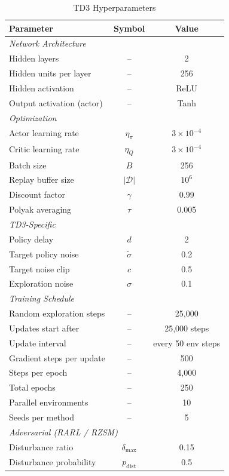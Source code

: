 \documentclass[conference]{IEEEtran}
\begin{document}
\begin{table}[h]
\centering
\caption{TD3 Hyperparameters}
\label{tab:hyperparams}
\begin{tabular}{lcc}
\hline
\textbf{Parameter} & \textbf{Symbol} & \textbf{Value} \\
\hline
\multicolumn{3}{l}{\textit{Network Architecture}} \\
Hidden layers & -- & 2 \\
Hidden units per layer & -- & 256 \\
Hidden activation & -- & ReLU \\
Output activation (actor) & -- & Tanh \\
\hline
\multicolumn{3}{l}{\textit{Optimization}} \\
Actor learning rate & $\eta_\pi$ & $3 \times 10^{-4}$ \\
Critic learning rate & $\eta_Q$ & $3 \times 10^{-4}$ \\
Batch size & $B$ & 256 \\
Replay buffer size & $|\mathcal{D}|$ & $10^6$ \\
Discount factor & $\gamma$ & 0.99 \\
Polyak averaging & $\tau$ & 0.005 \\
\hline
\multicolumn{3}{l}{\textit{TD3-Specific}} \\
Policy delay & $d$ & 2 \\
Target policy noise & $\tilde{\sigma}$ & 0.2 \\
Target noise clip & $c$ & 0.5 \\
Exploration noise & $\sigma$ & 0.1 \\
\hline
\multicolumn{3}{l}{\textit{Training Schedule}} \\
Random exploration steps & -- & 25{,}000 \\
Updates start after & -- & 25{,}000 steps \\
Update interval & -- & every 50 env steps \\
Gradient steps per update & -- & 500 \\
Steps per epoch & -- & 4{,}000 \\
Total epochs & -- & 250 \\
Parallel environments & -- & 10 \\
Seeds per method & -- & 5 \\
\hline
\multicolumn{3}{l}{\textit{Adversarial (RARL / RZSM)}} \\
Disturbance ratio & $\delta_{\max}$ & 0.15 \\
Disturbance probability & $p_{\mathrm{dist}}$ & 0.5 \\

\end{tabular}
\end{table}
\end{document}
